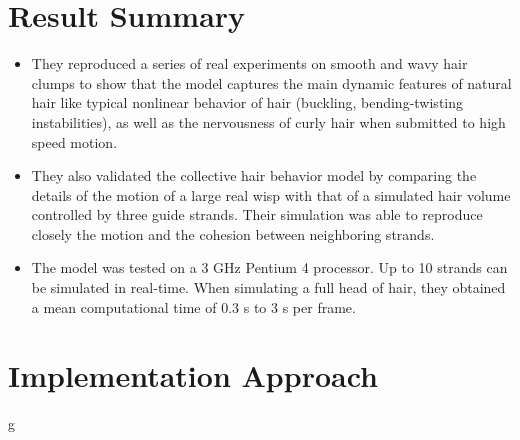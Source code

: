 \documentclass[paper=a4, fontsize=11pt]{scrartcl}
\begin{document}
\section{Result Summary}
\begin{itemize}
\item They reproduced a series of
real experiments on smooth and wavy hair clumps to show that the
model captures the main dynamic features of natural hair like typical nonlinear behavior of hair (buckling, bending-twisting instabilities), as well as the nervousness of curly hair when submitted to high speed motion.
\item They also validated the collective hair behavior
model by comparing the details of the motion of a large real wisp
with that of a simulated hair volume controlled by three guide
strands. Their simulation was able to reproduce closely the motion
and the cohesion between neighboring strands.
\item The model was tested on a 3 GHz Pentium 4 processor. Up to 10
strands can be simulated in real-time. When simulating a full head
of hair, they obtained a mean computational time of
0.3 s to 3 s per frame. 
\end{itemize}
\section{Implementation Approach}
g
\end{document}
